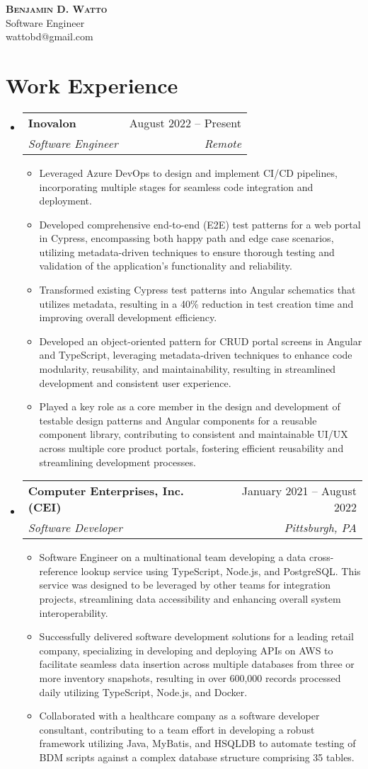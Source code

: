 \documentclass[letterpaper,12pt]{article}
\makeatletter
\newcommand{\resumeItem}[1]{
  \item\small{
    {#1 \vspace{-1pt}}
  }
}
\newcommand{\resumeSubheading}[4]{
  \vspace{2pt}\item
    \begin{tabular*}{0.97\textwidth}[t]{l@{\extracolsep{\fill}}r}
      \textbf{#1} & #2 \\
      \textit{\small#3} & \textit{\small #4} \\
    \end{tabular*}\vspace{-7pt}
}
\newcommand{\resumeSubHeadingListStart}{\begin{itemize}[leftmargin=0.15in, label={}]}
\newcommand{\resumeSubHeadingListEnd}{\end{itemize}}
\newcommand{\resumeItemListStart}{\begin{itemize}}
\newcommand{\resumeItemListEnd}{\end{itemize}\vspace{5pt}}
\makeatother
\begin{document}
\begin{flushleft}
  \textbf{\Huge \scshape Benjamin D. Watto } \\ \vspace{5pt}
  \small Software Engineer \\
  \small wattobd@gmail.com
\end{flushleft}


\section{Work Experience}
\resumeSubHeadingListStart
\resumeSubheading
{Inovalon}{August 2022 -- Present}
{Software Engineer}{Remote}
\resumeItemListStart
\resumeItem{Leveraged Azure DevOps to design and implement CI/CD pipelines, incorporating multiple stages for seamless code integration and deployment.}
\resumeItem{Developed comprehensive end-to-end (E2E) test patterns for a web portal in Cypress, encompassing both happy path and edge case scenarios, utilizing metadata-driven techniques to ensure thorough testing and validation of the application's functionality and reliability.}
\resumeItem{Transformed existing Cypress test patterns into Angular schematics that utilizes metadata, resulting in a 40\% reduction in test creation time and improving overall development efficiency.}
\resumeItem{Developed an object-oriented pattern for CRUD portal screens in Angular and TypeScript, leveraging metadata-driven techniques to enhance code modularity, reusability, and maintainability, resulting in streamlined development and consistent user experience.}
\resumeItem{Played a key role as a core member in the design and development of testable design patterns and Angular components for a reusable component library, contributing to consistent and maintainable UI/UX across multiple core product portals, fostering efficient reusability and streamlining development processes.}
\resumeItemListEnd

\resumeSubheading
{Computer Enterprises, Inc. (CEI)}{January 2021 -- August 2022}
{Software Developer }{Pittsburgh, PA}
\resumeItemListStart
\resumeItem{Software Engineer on a multinational team developing a data cross-reference lookup service using TypeScript, Node.js, and PostgreSQL. This service was designed to be leveraged by other teams for integration projects, streamlining data accessibility and enhancing overall system interoperability.}
\resumeItem{Successfully delivered software development solutions for a leading retail company, specializing in developing and deploying APIs on AWS to facilitate seamless data insertion across multiple databases from three or more inventory snapshots, resulting in over 600,000 records processed daily utilizing TypeScript, Node.js, and Docker.}
\resumeItem{Collaborated with a healthcare company as a software developer consultant, contributing to a team effort in developing a robust framework utilizing Java, MyBatis, and HSQLDB to automate testing of BDM scripts against a complex database structure comprising 35 tables.}
\resumeItemListEnd
\vspace{-12.5pt}
\resumeSubHeadingListEnd
\end{document}
